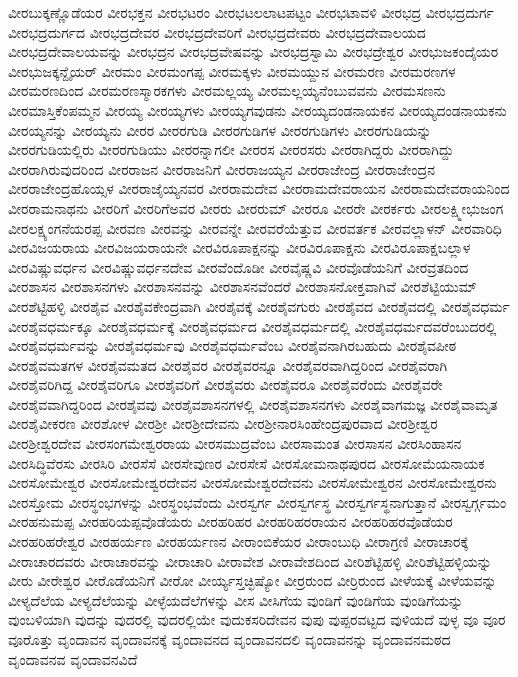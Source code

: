 {ವೀರಬುಕ್ಕಣ್ಣೊಡೆಯರ
ವೀರಭಕ್ತನ
ವೀರಭಟರಂ
ವೀರಭಟಲಲಾಟಪಟ್ಟಂ
ವೀರಭಟಾವಳಿ
ವೀರಭದ್ರ
ವೀರಭದ್ರದುರ್ಗ
ವೀರಭದ್ರದುರ್ಗದ
ವೀರಭದ್ರದೇವರ
ವೀರಭದ್ರದೇವರಿಗೆ
ವೀರಭದ್ರದೇವರು
ವೀರಭದ್ರದೇವಾಲಯದ
ವೀರಭದ್ರದೇವಾಲಯವನ್ನು
ವೀರಭದ್ರನ
ವೀರಭದ್ರವೇಷವನ್ನು
ವೀರಭದ್ರಸ್ವಾಮಿ
ವೀರಭದ್ರೇಶ್ವರ
ವೀರಭುಜಕಂದೈಯರ
ವೀರಭುಜಕ್ಕನ್ದೈಯರ್
ವೀರಮಂ
ವೀರಮಂಗಪ್ಪ
ವೀರಮಕ್ಕಳು
ವೀರಮಯ್ದುನ
ವೀರಮರಣ
ವೀರಮರಣಗಳ
ವೀರಮರಣದಿಂದ
ವೀರಮರಣಸ್ಮಾರಕಗಳು
ವೀರಮಲ್ಲಯ್ಯ
ವೀರಮಲ್ಲಯ್ಯನೆಂಬುವವನು
ವೀರಮಸಣನು
ವೀರಮಾಸ್ತಿಕೆಂಪಮ್ಮನ
ವೀರಯ್ಯ
ವೀರಯ್ಯಗಳು
ವೀರಯ್ಯಗವುಡನು
ವೀರಯ್ಯದಂಡನಾಯಕನ
ವೀರಯ್ಯದಂಡನಾಯಕನು
ವೀರಯ್ಯನನ್ನು
ವೀರಯ್ಯನು
ವೀರರ
ವೀರರಗುಡಿ
ವೀರರಗುಡಿಗಳ
ವೀರರಗುಡಿಗಳು
ವೀರರಗುಡಿಯನ್ನು
ವೀರರಗುಡಿಯಲ್ಲಿರು
ವೀರರಗುಡಿಯು
ವೀರರನ್ನಾಗಲೀ
ವೀರರಸ
ವೀರರಸರು
ವೀರರಾಗಿದ್ದರು
ವೀರರಾಗಿದ್ದು
ವೀರರಾಗಿರುವುದರಿಂದ
ವೀರರಾಜನ
ವೀರರಾಜನಿಗೆ
ವೀರರಾಜಯ್ಯನ
ವೀರರಾಜೇಂದ್ರ
ವೀರರಾಜೇಂದ್ರನ
ವೀರರಾಜೇಂದ್ರಹೊಯ್ಸಳ
ವೀರರಾಜೈಯ್ಯನವರ
ವೀರರಾಮದೇವ
ವೀರರಾಮದೇವರಾಯನ
ವೀರರಾಮದೇವರಾಯನಿಂದ
ವೀರರಾಮನಾಥನು
ವೀರರಿಗೆ
ವೀರರಿಗೆಅವರ
ವೀರರು
ವೀರರುಮ್
ವೀರರೂ
ವೀರರೇ
ವೀರರ್ಕರು
ವೀರಲಕ್ಷ್ಮೀಭುಜಂಗ
ವೀರಲಕ್ಷ್ಯಂಗನೆಯರಪ್ಪ
ವೀರವಣ
ವೀರವನ್ನು
ವೀರವನ್ನೇ
ವೀರವರೆಯೆತ್ತುವ
ವೀರವರ್ತಕ
ವೀರವಲ್ಲಾಳನ್
ವೀರವಾರಿಧಿ
ವೀರವಿಜಯರಾಯ
ವೀರವಿಜಯರಾಯನೇ
ವೀರವಿರೂಪಾಕ್ಷನನ್ನು
ವೀರವಿರೂಪಾಕ್ಷನು
ವೀರವಿರೂಪಾಕ್ಷಬಲ್ಲಾಳ
ವೀರವಿಷ್ಣುವರ್ಧನ
ವೀರವಿಷ್ಣುವರ್ಧನದೇವ
ವೀರವೆಂದೊಡೀ
ವೀರವೈಷ್ಣವಿ
ವೀರವೊಡೆಯನಿಗೆ
ವೀರವ್ರತದಿಂದ
ವೀರಶಾಸನ
ವೀರಶಾಸನಗಳು
ವೀರಶಾಸನವನ್ನು
ವೀರಶಾಸನವೆಂದರೆ
ವೀರಶಾಸನೋಕ್ತವಾಗಿವೆ
ವೀರಶೆಟ್ಟಿಯುಮ್
ವೀರಶೆಟ್ಟಿಹಳ್ಳಿ
ವೀರಶೈವ
ವೀರಶೈವಕೇಂದ್ರವಾಗಿ
ವೀರಶೈವಕ್ಕೆ
ವೀರಶೈವಗುರು
ವೀರಶೈವದ
ವೀರಶೈವದಲ್ಲಿ
ವೀರಶೈವಧರ್ಮ
ವೀರಶೈವಧರ್ಮಕ್ಕೂ
ವೀರಶೈವಧರ್ಮಕ್ಕೆ
ವೀರಶೈವಧರ್ಮದ
ವೀರಶೈವಧರ್ಮದಲ್ಲಿ
ವೀರಶೈವಧರ್ಮದವರೆಂಬುದರಲ್ಲಿ
ವೀರಶೈವಧರ್ಮವನ್ನು
ವೀರಶೈವಧರ್ಮವು
ವೀರಶೈವಧರ್ಮವೆಂಬ
ವೀರಶೈವನಾಗಿರಬಹುದು
ವೀರಶೈವಪೀಠ
ವೀರಶೈವಮತಗಳ
ವೀರಶೈವಮತದ
ವೀರಶೈವರ
ವೀರಶೈವರನ್ನೂ
ವೀರಶೈವರವಾಗಿದ್ದರಿಂದ
ವೀರಶೈವರಾಗಿ
ವೀರಶೈವರಿಗಿದ್ದ
ವೀರಶೈವರಿಗೂ
ವೀರಶೈವರಿಗೆ
ವೀರಶೈವರು
ವೀರಶೈವರೂ
ವೀರಶೈವರೆಂದು
ವೀರಶೈವರೇ
ವೀರಶೈವವಾಗಿದ್ದರಿಂದ
ವೀರಶೈವವು
ವೀರಶೈವಶಾಸನಗಳಲ್ಲಿ
ವೀರಶೈವಶಾಸನಗಳು
ವೀರಶೈವಾಗಮಜ್ಞ
ವೀರಶೈವಾಮೃತ
ವೀರಶೈವೀಕರಣ
ವೀರಶೋಳ
ವೀರಶ್ರೀ
ವೀರಶ್ರೀದೇವನು
ವೀರಶ್ರೀನಾರಸಿಂಹೇಂದ್ರಪುರವಾದ
ವೀರಶ್ರೀಶ್ವರ
ವೀರಶ್ರೀಶ್ವರದೇವ
ವೀರಸಂಗಮೇಶ್ವರರಾಯ
ವೀರಸಮುದ್ರವೆಂಬ
ವೀರಸಾಮಂತ
ವೀರಸಾಸನ
ವೀರಸಿಂಹಾಸನ
ವೀರಸಿದ್ಧಿವೆರಸು
ವೀರಸಿರಿ
ವೀರಸೆಸೆ
ವೀರಸೇವುಣರ
ವೀರಸೇಸೆ
ವೀರಸೋಮನಾಥಪುರದ
ವೀರಸೋಮೆಯನಾಯಕ
ವೀರಸೋಮೇಶ್ವರ
ವೀರಸೋಮೇಶ್ವರದೇವನ
ವೀರಸೋಮೇಶ್ವರದೇವನು
ವೀರಸೋಮೇಶ್ವರನ
ವೀರಸೋಮೇಶ್ವರನು
ವೀರಸ್ತೋಮ
ವೀರಸ್ಥಂಭಗಳನ್ನು
ವೀರಸ್ಥಂಭವೆಂದು
ವೀರಸ್ವರ್ಗ
ವೀರಸ್ವರ್ಗಸ್ಥ
ವೀರಸ್ವರ್ಗಸ್ಥನಾಗುತ್ತಾನೆ
ವೀರಸ್ವರ್ಗ್ಗಮಂ
ವೀರಹನುಮಪ್ಪ
ವೀರಹರಿಯಪ್ಪವೊಡೆಯರು
ವೀರಹರಿಹರ
ವೀರಹರಿಹರರಾಯನ
ವೀರಹರಿಹರವೊಡೆಯರ
ವೀರಹರಿಹರೇಶ್ವರ
ವೀರಹರ್ಯಣ
ವೀರಹರ್ಯಣನ
ವೀರಾಂಬಿಕೆಯರ
ವೀರಾಂಬುಧಿ
ವೀರಾಗ್ರಣಿ
ವೀರಾಚಾರಕ್ಕೆ
ವೀರಾಚಾರದವರು
ವೀರಾಚಾರವನ್ನು
ವೀರಾಚಾರಿ
ವೀರಾವೇಶ
ವೀರಾವೇಶದಿಂದ
ವೀರಿಶೆಟ್ಟಿಹಳ್ಳಿ
ವೀರಿಶೆಟ್ಟಿಹಳ್ಳಿಯನ್ನು
ವೀರು
ವೀರೇಶ್ವರ
ವೀರೊಡೆಯನಿಗೆ
ವೀರೋ
ವೀರ್ಯ್ಯಸ್ತಚ್ಛಿಷ್ಯೋ
ವೀರ್ರರುಂದ
ವೀರ್ರಿರುಂದ
ವೀಳೆಯಕ್ಕೆ
ವೀಳೆಯವನ್ನು
ವೀಳ್ಯದೆಲೆಯ
ವೀಳ್ಯದೆಲೆಯನ್ನು
ವೀಳ್ಳೆಯದೆಲೆಗಳನ್ನು
ವೀಸ
ವೀಸಿಗೆಯ
ವುಂಡಿಗೆ
ವುಂಡಿಗೆಯ
ವುಂಡಿಗೆಯನ್ನು
ವುಂಬಳಿಯಾಗಿ
ವುದನ್ನು
ವುದರಲ್ಲಿ
ವುದರಲ್ಲಿಯೇ
ವುದುಕಸರಿದೇವನ
ವುಪು
ವುಪ್ಪರವಟ್ಟದ
ವುಳಿಯದೆ
ವುಳ್ಳ
ವೂ
ವೂರ
ವೂರೊತ್ತು
ವೃಂದಾವನ
ವೃಂದಾವನಕ್ಕೆ
ವೃಂದಾವನದ
ವೃಂದಾವನದಲಿ
ವೃಂದಾವನನ್ನು
ವೃಂದಾವನಮಠದ
ವೃಂದಾವನವ
ವೃಂದಾವನವಿದೆ
}
